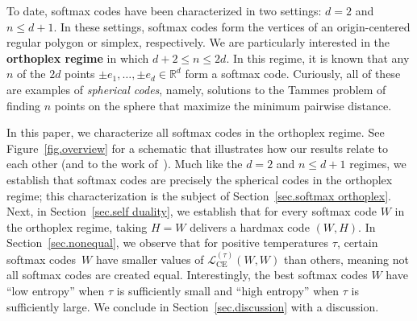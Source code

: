 \documentclass{article}
\theoremstyle{plain}
\theoremstyle{definition}
\begin{document}
To date, softmax codes have been characterized in two settings: $d=2$ and $n\leq d+1$.
In these settings, softmax codes form the vertices of an origin-centered regular polygon or simplex, respectively.
We are particularly interested in the \textbf{orthoplex regime} in which $d+2\leq n\leq 2d$.
In this regime, it is known that any $n$ of the $2d$ points $\pm e_1,\ldots,\pm e_d\in\mathbb{R}^d$ form a softmax code.
Curiously, all of these are examples of \textit{spherical codes}, namely, solutions to the Tammes problem of finding $n$ points on the sphere that maximize the minimum pairwise distance.

In this paper, we characterize all softmax codes in the orthoplex regime.
See Figure~\ref{fig.overview} for a schematic that illustrates how our results relate to each other (and to the work of~\cite{JiangEtal:24}).
Much like the $d=2$ and $n\leq d+1$ regimes, we establish that softmax codes are precisely the spherical codes in the orthoplex regime; this characterization is the subject of Section~\ref{sec.softmax orthoplex}.
Next, in Section~\ref{sec.self duality}, we establish that for every softmax code $W$ in the orthoplex regime, taking $H=W$ delivers a hardmax code $(W,H)$.
In Section~\ref{sec.nonequal}, we observe that for positive temperatures $\tau$, certain softmax codes~$W$ have smaller values of $\mathcal{L}_{\operatorname{CE}}^{(\tau)}(W,W)$ than others, meaning not all softmax codes are created equal.
Interestingly, the best softmax codes $W$ have ``low entropy'' when $\tau$ is sufficiently small and ``high entropy'' when $\tau$ is sufficiently large.
We conclude in Section~\ref{sec.discussion} with a discussion.
\end{document}

